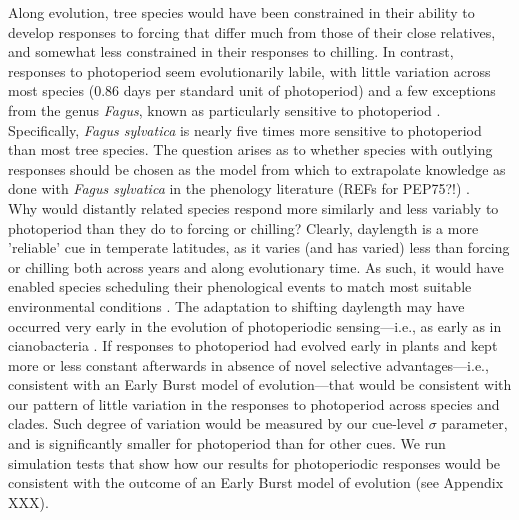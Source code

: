 \documentclass{article}\usepackage[]{graphicx}\usepackage[]{color}
\begin{document}
Along evolution, tree species would have been constrained %
in their ability to develop responses to forcing that differ much from those of their close relatives, and somewhat less constrained in their responses to chilling. In contrast, responses to photoperiod seem evolutionarily labile, with little variation across most species (0.86 days per standard unit of photoperiod) and a few exceptions from the genus \emph{Fagus}, known as particularly sensitive to photoperiod \citep{fu2019}. Specifically, \emph{Fagus sylvatica} is nearly five times more sensitive to photoperiod than most tree species. The question arises as to whether species with outlying responses should be chosen as the model from which to extrapolate knowledge as done with \emph{Fagus sylvatica} in the phenology literature (REFs for PEP75?!) %
.\\

Why would distantly related species respond more similarly and less variably to photoperiod than they do to forcing or chilling? Clearly, daylength is a more 'reliable' cue in temperate latitudes, as it varies (and has varied) less than forcing or chilling both across years and along evolutionary time. As such, it would have enabled species scheduling their phenological events to match most suitable environmental conditions \citep{jackson2009plant}. The adaptation to shifting daylength may have occurred very early in the evolution of photoperiodic sensing---i.e., as early as in cianobacteria \citep{hut2011evolution, serrano2017evolution}. If responses to photoperiod had evolved early in plants and kept more or less constant afterwards in absence of novel selective advantages---i.e., consistent with an Early Burst model of evolution---that would be consistent with our pattern of little variation in the responses to photoperiod across species and clades. Such degree of variation would be measured by our cue-level $\sigma$ parameter, and is significantly smaller for photoperiod than for other cues. We run simulation tests that show how our results for photoperiodic responses would be consistent with the outcome of an Early Burst model of evolution (see Appendix XXX).\\  
\end{document}
